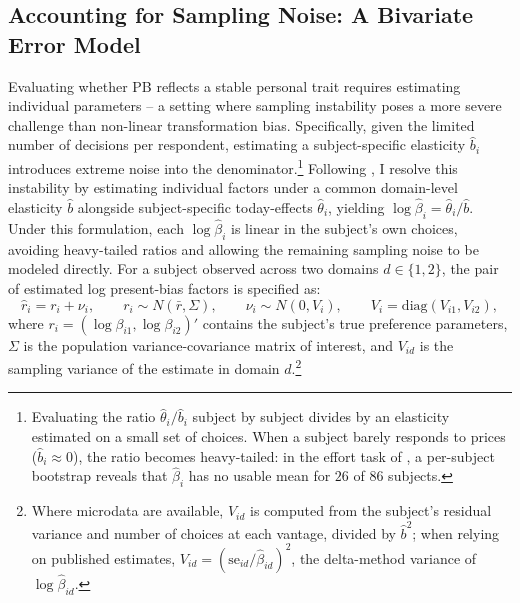 \documentclass[11pt,a4paper]{article}
\theoremstyle{plain}
\theoremstyle{definition}
\begin{document}
\subsection{Accounting for Sampling Noise: A Bivariate Error Model}
\label{sec:memodel}

Evaluating whether PB reflects a stable personal trait requires estimating individual parameters -- a setting where sampling instability poses a more severe challenge than non-linear transformation bias.  Specifically, given the limited number of decisions per respondent, estimating a subject-specific elasticity $\hat{b}_i$ introduces extreme noise into the denominator.\footnote{%
Evaluating the ratio $\hat\theta_i/\hat b_i$ subject by subject divides by an elasticity estimated on a small set of choices. %
When a subject barely responds to prices ($\hat b_i \approx 0$), the ratio becomes heavy-tailed: in the effort task of \citet{ans2015}, a per-subject bootstrap reveals that $\hat\beta_i$ has no usable mean for $26$ of $86$ subjects.} 
Following \citet{ans2015}, I resolve this instability by estimating individual factors under a common domain-level elasticity $\hat{b}$ alongside subject-specific today-effects $\hat{\theta}_i$, yielding $\log\hat{\beta}_i = \hat{\theta}_i / \hat{b}$.
Under this formulation, %
each $\log\hat{\beta}_i$ is linear in the subject's own choices, avoiding heavy-tailed ratios and allowing the remaining sampling noise to be modeled directly. For a subject observed across two domains $d \in \{1,2\}$, the pair of estimated log present-bias factors is specified as:
\[
\hat r_i = r_i + \nu_i, \qquad r_i \sim N(\bar r, \Sigma), \qquad \nu_i \sim N(0, V_i), \qquad V_i = \mathrm{diag}(V_{i1}, V_{i2}),
\]
where $r_i = (\log\beta_{i1}, \log\beta_{i2})'$ contains the subject's true preference parameters, $\Sigma$ is the population variance-covariance matrix of interest, and $V_{id}$ is the sampling variance of the estimate in domain $d$.\footnote{%
Where microdata are available, $V_{id}$ is computed from the subject's residual variance and number of choices at each vantage, divided by $\hat b^2$; when relying on published %
estimates, $V_{id}=(\mathrm{se}_{id}/\hat\beta_{id})^2$, the delta-method variance of $\log\hat\beta_{id}$.} %
\end{document}
